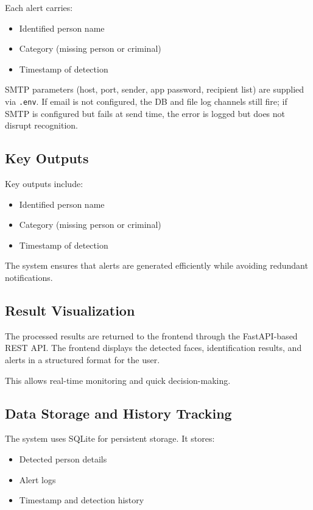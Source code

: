 \documentclass[11pt]{report}
\begin{document}
Each alert carries:
\begin{itemize}
    \item Identified person name
    \item Category (missing person or criminal)
    \item Timestamp of detection
\end{itemize}

SMTP parameters (host, port, sender, app password, recipient list) are supplied via \texttt{.env}. If email is not configured, the DB and file log channels still fire; if SMTP is configured but fails at send time, the error is logged but does not disrupt recognition.

\subsection*{Key Outputs}

Key outputs include:
\begin{itemize}
    \item Identified person name
    \item Category (missing person or criminal)
    \item Timestamp of detection
\end{itemize}

The system ensures that alerts are generated efficiently while avoiding redundant notifications.

\subsection{ Result Visualization}

The processed results are returned to the frontend through the FastAPI-based REST API. The frontend displays the detected faces, identification results, and alerts in a structured format for the user.

This allows real-time monitoring and quick decision-making.

\subsection{ Data Storage and History Tracking}

The system uses SQLite for persistent storage. It stores:
\begin{itemize}
    \item Detected person details
    \item Alert logs
    \item Timestamp and detection history
\end{itemize}
\end{document}
